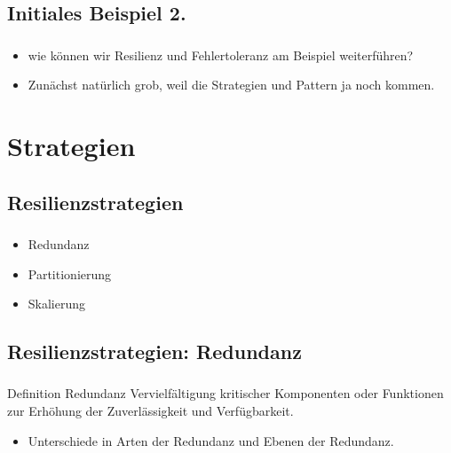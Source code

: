 \subsection{Initiales Beispiel 2.}

\begin{frame}
    \frametitle{\insertsection}
    \framesubtitle{\insertsubsection}

    \begin{itemize}
        \item wie können wir Resilienz und Fehlertoleranz am Beispiel weiterführen?
        \item Zunächst natürlich grob, weil die Strategien und Pattern ja noch kommen.
    \end{itemize}
\end{frame}


\section{Strategien}
\subsection{\textbf{Resilienzstrategien}}
\begin{frame}
    \frametitle{\insertsection}
    \framesubtitle{\insertsubsection}

    \begin{itemize}
        \item Redundanz
        \item Partitionierung
        \item Skalierung
    \end{itemize}
\end{frame}

\subsection{Resilienzstrategien: Redundanz}
\begin{frame}
    \frametitle{\insertsection}
    \framesubtitle{\insertsubsection}

    \begin{block}{Definition Redundanz}
        Vervielfältigung kritischer Komponenten oder Funktionen zur Erhöhung der Zuverlässigkeit und Verfügbarkeit.\\
        \begin{itemize}
            \item Unterschiede in Arten der Redundanz und Ebenen der Redundanz.
        \end{itemize}
    \end{block}
\end{frame}


